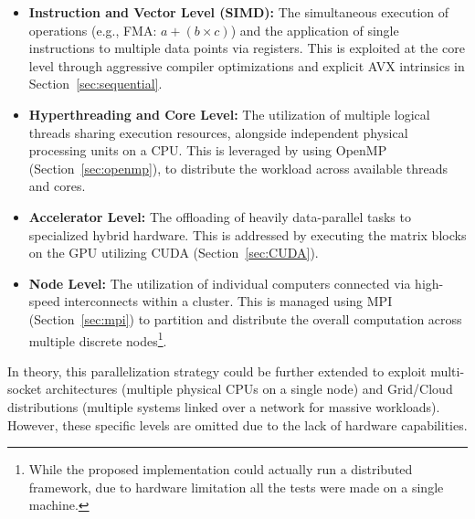 \begin{itemize}
    \item \textbf{Instruction and Vector Level (SIMD):} The simultaneous execution of operations (e.g., FMA: $a + (b \times c)$) and the application of single instructions to multiple data points via registers. This is exploited at the core level through aggressive compiler optimizations and explicit AVX intrinsics in Section~\ref{sec:sequential}.
    
    \item \textbf{Hyperthreading and Core Level:} The utilization of multiple logical threads sharing execution resources, alongside independent physical processing units on a CPU. This is leveraged by using OpenMP (Section~\ref{sec:openmp}), to distribute the workload across available threads and cores.
    
    \item \textbf{Accelerator Level:} The offloading of heavily data-parallel tasks to specialized hybrid hardware. This is addressed by executing the matrix blocks on the GPU utilizing CUDA (Section~\ref{sec:CUDA}).
    
    \item \textbf{Node Level:} The utilization of individual computers connected via high-speed interconnects within a cluster. This is managed using MPI (Section~\ref{sec:mpi}) to partition and distribute the overall computation across multiple discrete nodes\footnote{While the proposed implementation could actually run a distributed framework, due to hardware limitation all the tests were made on a single machine.}.
\end{itemize}



In theory, this parallelization strategy could be further extended to exploit multi-socket architectures (multiple physical CPUs on a single node) and Grid/Cloud distributions (multiple systems linked over a network for massive workloads). However, these specific levels are omitted due to the lack of hardware capabilities.